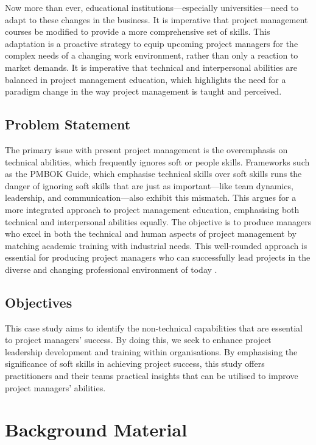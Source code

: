\documentclass{article}
\begin{document}
Now more than ever, educational institutions—especially universities—need to adapt to these changes in the business. It is imperative that project management courses be modified to provide a more comprehensive set of skills. This adaptation is a proactive strategy to equip upcoming project managers for the complex needs of a changing work environment, rather than only a reaction to market demands. It is imperative that technical and interpersonal abilities are balanced in project management education, which highlights the need for a paradigm change in the way project management is taught and perceived.

\subsection{Problem Statement}
The primary issue with present project management is the overemphasis on technical abilities, which frequently ignores soft or people skills. Frameworks such as the PMBOK Guide, which emphasise technical skills over soft skills runs the danger of ignoring soft skills that are just as important—like team dynamics, leadership, and communication—also exhibit this mismatch. This argues for a more integrated approach to project management education, emphasising both technical and interpersonal abilities equally. The objective is to produce managers who excel in both the technical and human aspects of project management by matching academic training with industrial needs. This well-rounded approach is essential for producing project managers who can successfully lead projects in the diverse and changing professional environment of today \cite{pant2008project}. 



\subsection{Objectives}
This case study aims to identify the non-technical capabilities that are essential to project managers' success. By doing this, we seek to enhance project leadership development and training within organisations. By emphasising the significance of soft skills in achieving project success, this study offers practitioners and their teams practical insights that can be utilised to improve project managers' abilities.

\section{Background Material}
\end{document}
